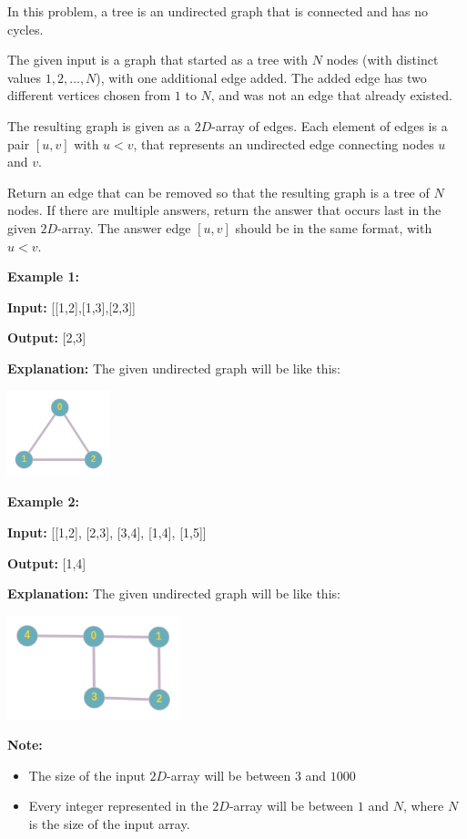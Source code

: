 \documentclass[a4paper]{article}
\begin{document}
In this problem, a tree is an undirected graph that is connected and has no cycles.

The given input is a graph that started as a tree with $N$ nodes (with distinct values $1, 2, \dots, N$), with one additional edge added. The added edge has two different vertices chosen from $1$ to $N$, and was not an edge that already existed.

The resulting graph is given as a $2D$-array of edges. Each element of edges is a pair $[u, v]$ with $u < v$, that represents an undirected edge connecting nodes $u$ and $v$.

Return an edge that can be removed so that the resulting graph is a tree of $N$ nodes. If there are multiple answers, return the answer that occurs last in the given $2D$-array. The answer edge $[u, v]$ should be in the same format, with $u < v$.

\SPACE

\textbf{Example 1:}

\textbf{Input:} [[1,2],[1,3],[2,3]]

\textbf{Output:} [2,3]

\textbf{Explanation:} The given undirected graph will be like this:\\
\begin{center}
\includegraphics[width=3cm]{images/1.png}
\end{center}

\SPACE


\textbf{Example 2:}

\textbf{Input:} [[1,2], [2,3], [3,4], [1,4], [1,5]]

\textbf{Output:} [1,4]

\textbf{Explanation:} The given undirected graph will be like this:\\
\begin{center}
\includegraphics[width=5cm]{images/2.png}
\end{center}



\textbf{Note:}

\begin{itemize}
\item The size of the input $2D$-array will be between $3$ and $1000$
\item Every integer represented in the $2D$-array will be between $1$ and $N$, where $N$ is the size of the input array.
\end{itemize}
\end{document}
